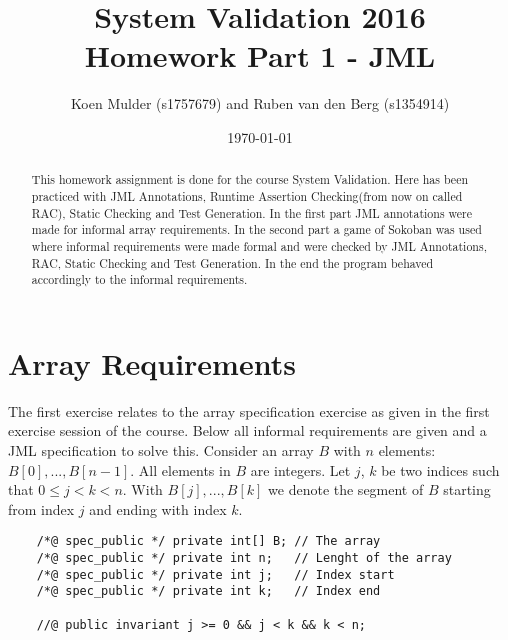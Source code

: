 \documentclass[a4paper]{article}
\title{System Validation 2016 \\ Homework Part 1 - JML}
\author{Koen Mulder (s1757679) and Ruben van den Berg (s1354914)}
\date{\today}
\begin{document}
\maketitle

\begin{abstract}
This homework assignment is done for the course System Validation. Here has been practiced with JML Annotations, Runtime Assertion Checking(from now on called RAC), Static Checking and Test Generation. In the first part JML annotations were made for informal array requirements. In the second part a game of Sokoban was used where informal requirements were made formal and were checked by JML Annotations, RAC, Static Checking and Test Generation. In the end the program behaved accordingly to the informal requirements. 
\end{abstract}

\section{Array Requirements}
The first exercise relates to the array specification exercise as given in the first exercise session of the course. Below all informal requirements are given and a JML specification to solve this.
Consider an array $B$ with $n$ elements: $B[0], . . . , B[n-1]$.
All elements in $B$ are integers. Let $j$, $k$ be two indices such that $0 \leq j < k < n$.
With $B[j], . . . , B[k]$ we denote the segment of $B$ starting from index $j$ and ending with index $k$.
\begin{lstlisting}
	/*@ spec_public */ private int[] B;	// The array
	/*@ spec_public */ private int n;	// Lenght of the array
	/*@ spec_public */ private int j;	// Index start
	/*@ spec_public */ private int k;	// Index end
	
	//@ public invariant j >= 0 && j < k && k < n;
\end{lstlisting}
\end{document}
